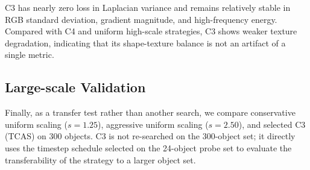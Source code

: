 \documentclass[times,twocolumn,final]{elsarticle}
\begin{document}
\begin{table}[h!]
\centering
\caption{Comparison of representative variants under extended texture metrics. All delta texture metrics are computed relative to the corresponding ground-truth foreground renderings under the same views and masks. This table verifies that the advantage of C3 is not due to a single Laplacian variance metric.}
\label{tab:extended}
\end{table}

C3 has nearly zero loss in Laplacian variance and remains relatively stable in RGB standard deviation, gradient magnitude, and high-frequency energy. Compared with C4 and uniform high-scale strategies, C3 shows weaker texture degradation, indicating that its shape-texture balance is not an artifact of a single metric.

\FloatBarrier

\subsection{Large-scale Validation}
\label{subsec:largescale}

Finally, as a transfer test rather than another search, we compare conservative uniform scaling ($s = 1.25$), aggressive uniform scaling ($s = 2.50$), and selected C3 (TCAS) on 300 objects. C3 is not re-searched on the 300-object set; it directly uses the timestep schedule selected on the 24-object probe set to evaluate the transferability of the strategy to a larger object set.

\begin{table}[t]
\centering
\caption{Large-scale validation on 300 objects. Values are absolute metrics of generated outputs with respect to ground truth.}
\label{tab:300obj}
\end{table}
\end{document}
